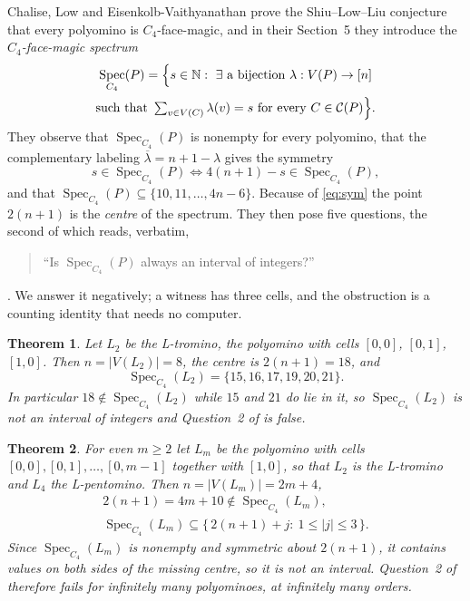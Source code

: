 \documentclass[11pt]{amsart}
\newtheorem{theorem}{Theorem}
\DeclareMathOperator{\Spec}{Spec}
\newcommand{\cells}{\mathcal C}
\begin{document}
Chalise, Low and Eisenkolb-Vaithyanathan \cite{CLE} prove the Shiu--Low--Liu
conjecture \cite{SLL} that every polyomino is $C_4$-face-magic, and in their
Section~5 they introduce the \emph{$C_4$-face-magic spectrum}
\begin{equation}\label{eq:spec}
\begin{gathered}
  \Spec_{C_4}(P)
  =\Bigl\{
     s\in\mathbb N:\ \exists\ \text{a bijection }\lambda:V(P)\to[n]\\
     \text{such that }\textstyle\sum_{v\in V(C)}\lambda(v)=s
     \text{ for every }C\in\cells(P)
   \Bigr\}.
\end{gathered}
\end{equation}
They observe that $\Spec_{C_4}(P)$ is nonempty for every polyomino, that the
complementary labeling $\overline\lambda=n+1-\lambda$ gives the symmetry
\begin{equation}\label{eq:sym}
  s\in\Spec_{C_4}(P)
  \iff
  4(n+1)-s\in\Spec_{C_4}(P),
\end{equation}
and that $\Spec_{C_4}(P)\subseteq\{10,11,\ldots,4n-6\}$. Because of
\eqref{eq:sym} the point $2(n+1)$ is the \emph{centre} of the spectrum. They
then pose five questions, the second of which reads, verbatim,
\begin{quote}
  ``Is $\Spec_{C_4}(P)$ always an interval of integers?''
\end{quote}
\cite[Section~5, Question~2]{CLE}. We answer it negatively; a witness has
three cells, and the obstruction is a counting identity that needs no
computer.

\begin{theorem}\label{thm:tromino}
Let $L_2$ be the L-tromino, the polyomino with cells $[0,0]$, $[0,1]$,
$[1,0]$. Then $n=|V(L_2)|=8$, the centre is $2(n+1)=18$, and
\[
  \Spec_{C_4}(L_2)=\{15,16,17,19,20,21\}.
\]
In particular $18\notin\Spec_{C_4}(L_2)$ while $15$ and $21$ do lie in it, so
$\Spec_{C_4}(L_2)$ is not an interval of integers and Question~2 of
\cite{CLE} is false.
\end{theorem}

\begin{theorem}\label{thm:family}
For even $m\ge2$ let $L_m$ be the polyomino with cells
$[0,0],[0,1],\ldots,[0,m-1]$ together with $[1,0]$, so that $L_2$ is the
L-tromino and $L_4$ the L-pentomino. Then $n=|V(L_m)|=2m+4$,
\[
\begin{gathered}
  2(n+1)=4m+10\notin\Spec_{C_4}(L_m),\\
  \Spec_{C_4}(L_m)\subseteq\bigl\{\,2(n+1)+j:\ 1\le|j|\le3\,\bigr\}.
\end{gathered}
\]
Since $\Spec_{C_4}(L_m)$ is nonempty and symmetric about $2(n+1)$, it
contains values on both sides of the missing centre, so it is not an interval.
Question~2 of \cite{CLE} therefore fails for infinitely many polyominoes, at
infinitely many orders.
\end{theorem}
\end{document}
